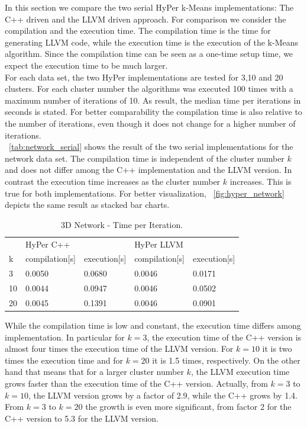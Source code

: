 In this section we compare the two serial HyPer k-Means implementations: The C++ driven and the LLVM driven approach. For comparison we consider the compilation and the execution time. The compilation time is the time for generating LLVM code, while the execution time is the execution of the k-Means algorithm. Since the compilation time can be seen as a one-time setup time, we expect the execution time to be much larger. 
\\
For each data set, the two HyPer implementations are tested for 3,10 and 20 clusters. For each cluster number the algorithms was executed 100 times with a maximum number of iterations of 10. As result, the median time per iterations in seconds is stated. For better comparability the compilation time is also relative to the number of iterations, even though it does not change for a higher number of iterations.
\\
~\autoref{tab:network_serial} shows the result of the two serial implementations for the network data set. The compilation time is independent of the cluster number $k$ and does not differ among the C++ implementation and the LLVM version. In contrast the execution time increases as the cluster number $k$ increases. This is true for both implementations. For better visualization, ~\autoref{fig:hyper_network} depicts the same result as stacked bar charts.

\begin{table}[htsb]
  \caption[3D Network - Time per Iteration]{3D Network - Time per Iteration.}\label{tab:network_serial}
  \centering
  \begin{tabular}{l l l l l}
    \toprule
      & HyPer C++ & & HyPer LLVM & \\
      k & compilation[s] & execution[s] & compilation[s] & execution[s] \\
    \midrule
      3 & 0.0050 & 0.0680 & 0.0046 & 0.0171 \\
      10 & 0.0044 & 0.0947 & 0.0046 & 0.0502 \\
      20 & 0.0045 & 0.1391 & 0.0046 & 0.0901 \\
    \bottomrule
  \end{tabular}
\end{table}



 While the compilation time is low and constant, the execution time differs among implementation. In particular for $k = 3$, the execution time of the C++ version is almost four times the execution time of the LLVM version. For $k = 10$ it is two times the execution time and for $k = 20$ it is 1.5 times, respectively. On the other hand that means that for a larger cluster number $k$, the LLVM execution time grows  faster than the execution time of the C++ version. Actually, from $k = 3$ to $k = 10$, the LLVM version grows by a factor of 2.9, while the C++ grows by 1.4. From $k = 3$ to $k = 20$ the growth is even more significant, from factor 2 for the C++ version to 5.3 for the LLVM version.


